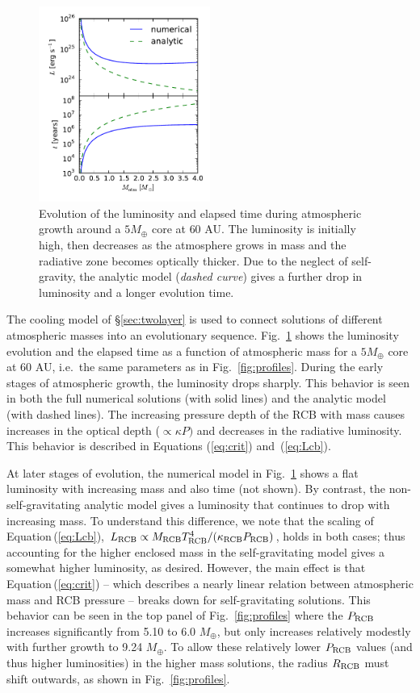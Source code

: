 \documentclass[apj, numberedappendix]{emulateapj}
\newcommand{\Eq}[1]{Equation\,(\ref{#1})}
\newcommand{\Eqs}[2]{Equations (\ref{#1}) and~(\ref{#2})}
\newcommand{\Fig}[1]{Fig.~\ref{#1}}
\newcommand{\cb}{_{\rm RCB}}
\begin{document}
\begin{figure}[tb]
\centering
\includegraphics[width=0.5\textwidth]{../../figs/ModelAtmospheres/RadSelfGravPoly/PaperFigs/Lt_profiles_v2.pdf}
\caption{Evolution of the luminosity and elapsed time during atmospheric growth around a $5 M_{\oplus}$ core at $60$ AU.  The luminosity is initially high, then decreases as the atmosphere grows in mass and the radiative zone becomes optically thicker.  Due to the neglect of self-gravity, the analytic model (\emph{dashed curve}) gives a further drop in luminosity and a longer evolution time.}
\label{fig:Ltplot}
\end{figure}

The cooling model of \S\ref{sec:twolayer} is used to connect solutions of different atmospheric masses into an evolutionary sequence.  \Fig{fig:Ltplot} shows the luminosity evolution and the elapsed time as a function of atmospheric mass for a $5 M_{\oplus}$ core at $60$ AU, i.e.\ the same parameters as in \Fig{fig:profiles}.  During the early stages of atmospheric growth, the luminosity drops sharply.  This behavior is seen in both the full numerical solutions (with solid lines) and the analytic model (with dashed lines).  The increasing pressure depth of the RCB with mass causes increases in the optical depth ($\propto \kappa P)$ and decreases in the radiative luminosity.  This behavior is described in \Eqs{eq:crit}{eq:Lcb}.

At later stages of evolution, the numerical model in \Fig{fig:Ltplot} shows a flat luminosity with increasing mass and also time (not shown).  By contrast, the non-self-gravitating analytic model gives a luminosity that continues to drop with increasing mass.  To understand this difference, we note that the scaling of \Eq{eq:Lcb}, $L\cb \propto M\cb T\cb^4/ (\kappa\cb  P\cb)$, holds in both cases; thus accounting for the higher enclosed mass in the self-gravitating model gives a somewhat higher luminosity, as desired.  However, the main effect is that \Eq{eq:crit} -- which describes a nearly linear relation between atmospheric mass and RCB pressure --  breaks down for self-gravitating solutions.  This behavior can be seen in the top panel of \Fig{fig:profiles} where the $P\cb$ increases significantly from 5.10 to 6.0 $M_\oplus$, but only increases relatively modestly with further growth to 9.24 $M_\oplus$.   To allow these relatively lower $P\cb$ values (and thus higher luminosities) in the higher mass solutions, the radius $R\cb$ must shift outwards, as shown in \Fig{fig:profiles}.
\end{document}
